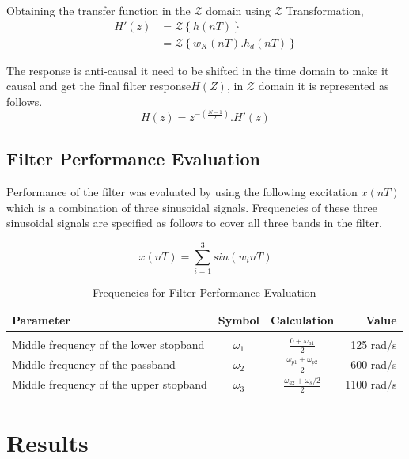 \documentclass[a4paper,11pt]{article}%
\begin{document}
Obtaining the transfer function in the $\mathcal{Z}$ domain using $\mathcal{Z}$ Transformation,
\begin{equation}
	\begin{split}
			H'(z) &= \mathcal{Z}\left\{ h(nT) \right\}\\
		&=\mathcal{Z}\left\{ w_K(nT).h_d(nT) \right\}
	\end{split}
\end{equation}

The response is anti-causal it need to be shifted in the time domain to make it causal and get the final filter response$H(Z)$, in $\mathcal{Z}$ domain it is represented as follows.
\begin{equation}
	H(z)= z^{-\left(\frac{N-1}{2}\right)}.H'(z)
\end{equation}

\subsection{Filter Performance Evaluation}

Performance of the filter was evaluated by using the following excitation $x(nT)$ which is a combination of three sinusoidal signals. Frequencies of these three sinusoidal signals are specified as follows to cover all three bands in the filter.

\[x(nT) = \sum_{i=1}^{3}sin(w_inT)\]

\begin{table}[!h]
	\centering
	
	\begin{tabular}{l c c r}
		\hline
	\textbf{Parameter}& \textbf{Symbol}& \textbf{Calculation}&\textbf{Value}\\\hline
	&&&\\
	Middle frequency of the lower stopband& $\omega_1$&$\frac{0+ \omega_{a1}}{2}$&125 rad/s\\
	Middle frequency of the passband &$\omega_2$&$\frac{\omega_{p1}+\omega_{p2}}{2}$&600 rad/s\\
	Middle frequency of the upper stopband& $\omega_3$&$\frac{\omega_{a2}+\omega_s/2}{2}$&1100 rad/s\\
	\hline\hline
	\end{tabular}
\caption{Frequencies for Filter Performance Evaluation}
\end{table}

\pagebreak
\section{Results}
\end{document}
